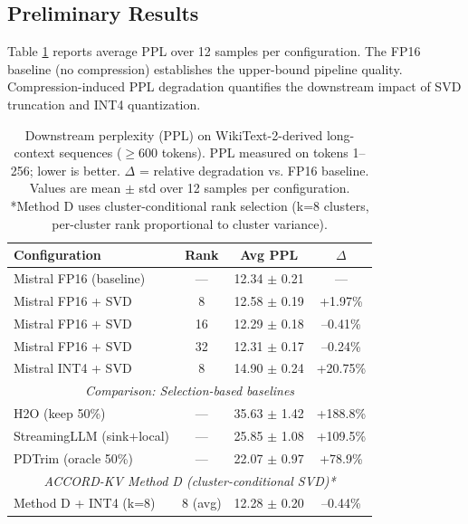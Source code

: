 \documentclass[11pt, a4paper, oneside]{article}
\theoremstyle{myplain}
\theoremstyle{mydefinition}
\theoremstyle{myremark}
\begin{document}
\subsection{Preliminary Results}

Table \ref{tab:ppl_results} reports average PPL over 12 samples per configuration. The FP16 baseline (no compression) establishes the upper-bound pipeline quality. Compression-induced PPL degradation quantifies the downstream impact of SVD truncation and INT4 quantization.

\begin{table}[t]
    \centering
    \caption{Downstream perplexity (PPL) on WikiText-2-derived long-context sequences ($\ge$600 tokens). PPL measured on tokens 1--256; lower is better. $\Delta$ = relative degradation vs. FP16 baseline. Values are mean $\pm$ std over 12 samples per configuration. *Method D uses cluster-conditional rank selection (k=8 clusters, per-cluster rank proportional to cluster variance).}
    \begin{tabular}{l|c|c|c}
    \toprule
    \textbf{Configuration} & \textbf{Rank} & \textbf{Avg PPL} & $\Delta$ \\
    \midrule
    Mistral FP16 (baseline) & —       & 12.34 $\pm$ 0.21 & —        \\
    Mistral FP16 + SVD      & 8       & 12.58 $\pm$ 0.19 & +1.97\%  \\
    Mistral FP16 + SVD      & 16      & 12.29 $\pm$ 0.18 & --0.41\% \\
    Mistral FP16 + SVD      & 32      & 12.31 $\pm$ 0.17 & --0.24\% \\
    Mistral INT4 + SVD      & 8       & 14.90 $\pm$ 0.24 & +20.75\% \\
    \midrule
    \multicolumn{4}{c}{\textit{Comparison: Selection-based baselines}} \\
    \midrule
    H2O (keep 50\%)         & —       & 35.63 $\pm$ 1.42 & +188.8\% \\
    StreamingLLM (sink+local) & —     & 25.85 $\pm$ 1.08 & +109.5\% \\
    PDTrim (oracle 50\%)    & —       & 22.07 $\pm$ 0.97 & +78.9\%  \\
    \midrule
    \multicolumn{4}{c}{\textit{ACCORD-KV Method D (cluster-conditional SVD)*}} \\
    \midrule
    Method D + INT4 (k=8)  & 8 (avg) & 12.28 $\pm$ 0.20 & --0.44\% \\
    \bottomrule
    \end{tabular}
    \label{tab:ppl_results}
\end{table}
\end{document}
